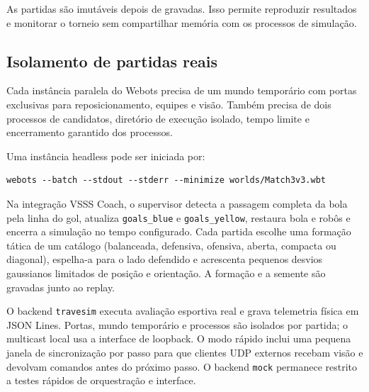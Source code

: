 \documentclass[12pt,a4paper]{article}
\begin{document}
As partidas s\~ao imut\'aveis depois de gravadas. Isso permite reproduzir resultados e monitorar o torneio sem compartilhar mem\'oria com os processos de simula\c{c}\~ao.

\subsection{Isolamento de partidas reais}

Cada inst\^ancia paralela do Webots precisa de um mundo tempor\'ario com portas exclusivas para reposicionamento, equipes e vis\~ao. Tamb\'em precisa de dois processos de candidatos, diret\'orio de execu\c{c}\~ao isolado, tempo limite e encerramento garantido dos processos.

Uma inst\^ancia headless pode ser iniciada por:

\begin{verbatim}
webots --batch --stdout --stderr --minimize worlds/Match3v3.wbt
\end{verbatim}

Na integra\c{c}\~ao VSSS Coach, o supervisor detecta a passagem completa da bola pela linha do gol, atualiza \texttt{goals\_blue} e \texttt{goals\_yellow}, restaura bola e rob\^os e encerra a simula\c{c}\~ao no tempo configurado. Cada partida escolhe uma forma\c{c}\~ao t\'atica de um cat\'alogo (balanceada, defensiva, ofensiva, aberta, compacta ou diagonal), espelha-a para o lado defendido e acrescenta pequenos desvios gaussianos limitados de posi\c{c}\~ao e orienta\c{c}\~ao. A forma\c{c}\~ao e a semente s\~ao gravadas junto ao replay.

O backend \texttt{travesim} executa avalia\c{c}\~ao esportiva real e grava telemetria f\'isica em JSON Lines. Portas, mundo tempor\'ario e processos s\~ao isolados por partida; o multicast local usa a interface de loopback. O modo r\'apido inclui uma pequena janela de sincroniza\c{c}\~ao por passo para que clientes UDP externos recebam vis\~ao e devolvam comandos antes do pr\'oximo passo. O backend \texttt{mock} permanece restrito a testes r\'apidos de orquestra\c{c}\~ao e interface.
\end{document}
